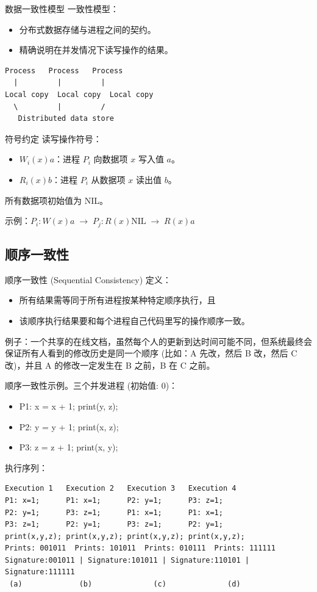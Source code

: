 数据一致性模型
一致性模型：
\begin{itemize}
\item 分布式数据存储与进程之间的契约。
\item 精确说明在并发情况下读写操作的结果。
\end{itemize}

\begin{verbatim}
Process   Process   Process
  |         |         |
Local copy  Local copy  Local copy
  \         |         /
   Distributed data store
\end{verbatim}

符号约定
读写操作符号：
\begin{itemize}
\item $W_i(x)a$：进程 $P_i$ 向数据项 $x$ 写入值 $a$。
\item $R_i(x)b$：进程 $P_i$ 从数据项 $x$ 读出值 $b$。
\end{itemize}
所有数据项初始值为 NIL。

示例：$P_i: W(x)a \;\rightarrow\; P_j: R(x)\text{NIL} \;\rightarrow\; R(x)a$

\subsection{顺序一致性}

顺序一致性 (Sequential Consistency) 定义：
\begin{itemize}
\item 所有结果需等同于所有进程按某种特定顺序执行，且
\item 该顺序执行结果要和每个进程自己代码里写的操作顺序一致。
\end{itemize}

例子：一个共享的在线文档，虽然每个人的更新到达时间可能不同，但系统最终会保证所有人看到的修改历史是同一个顺序 (比如：A 先改，然后 B 改，然后 C 改)，并且 A 的修改一定发生在 B 之前，B 在 C 之前。

顺序一致性示例。三个并发进程 (初始值: 0)：
\begin{itemize}
\item P1: x = x + 1; print(y, z);
\item P2: y = y + 1; print(x, z);
\item P3: z = z + 1; print(x, y);
\end{itemize}

执行序列：

\begin{verbatim}
Execution 1   Execution 2   Execution 3   Execution 4
P1: x=1;      P1: x=1;      P2: y=1;      P3: z=1;
P2: y=1;      P3: z=1;      P1: x=1;      P1: x=1;
P3: z=1;      P2: y=1;      P3: z=1;      P2: y=1;
print(x,y,z); print(x,y,z); print(x,y,z); print(x,y,z);
Prints: 001011  Prints: 101011  Prints: 010111  Prints: 111111
Signature:001011 | Signature:101011 | Signature:110101 | Signature:111111
 (a)             (b)              (c)              (d)
\end{verbatim}

